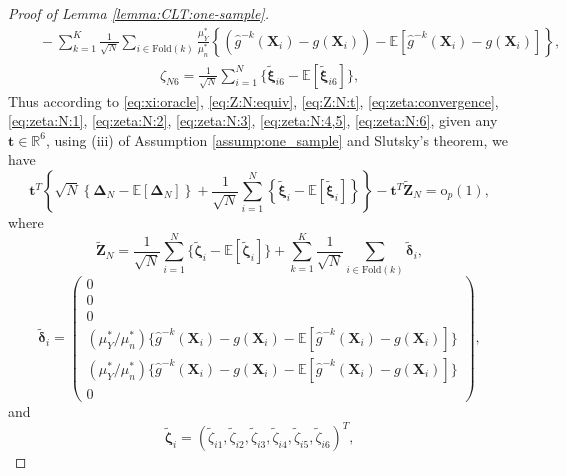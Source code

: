 \documentclass[12pt,letterpaper]{article}
\begin{document}
\begin{proof}[Proof of Lemma \ref{lemma:CLT:one-sample}]
\begin{equation}
\begin{array}{rl}
&\displaystyle\quad-\sum_{k=1}^K\frac{1}{\sqrt{N}}\sum_{i\in\textrm{Fold}(k)}\frac{\mu_Y^*}{\mu_n^*}\left\{\left(\hat{g}^{-k}(\mathbf{X}_i)-g(\mathbf{X}_i)\right)-\mathbb{E}\left[\hat{g}^{-k}(\mathbf{X}_i)-g(\mathbf{X}_i)\right]\right\},
\end{array}
\end{equation}
\begin{equation}\label{eq:zeta:N:6}
\begin{array}{rl}
\displaystyle\zeta_{N6}=\frac{1}{\sqrt{N}}\sum_{i=1}^N\{\tilde{\boldsymbol{\xi}}_{i6}-\mathbb{E}[\tilde{\boldsymbol{\xi}}_{i6}]\},
\end{array}
\end{equation}
Thus according to \eqref{eq:xi:oracle}, \eqref{eq:Z:N:equiv}, \eqref{eq:Z:N:t}, \eqref{eq:zeta:convergence}, \eqref{eq:zeta:N:1}, \eqref{eq:zeta:N:2}, \eqref{eq:zeta:N:3}, \eqref{eq:zeta:N:4,5}, \eqref{eq:zeta:N:6}, given any $\mathbf{t}\in\mathbb{R}^6$, using (iii) of Assumption \ref{assump:one_sample} and Slutsky's theorem, we have 
\begin{equation}\label{eq:Z:equiv:i.n.i.d.}
    \mathbf{t}^T\left\{\sqrt{N}\left\{\mathbf{\Delta}_N-\mathbb{E}[\mathbf{\Delta}_N]\right\}+\frac{1}{\sqrt{N}}\sum_{i=1}^N\left\{\tilde{\boldsymbol{\xi}}_i-\mathbb{E}[\tilde{\boldsymbol{\xi}}_i]\right\}\right\}-\mathbf{t}^T\widetilde{\mathbf{Z}}_N=\mathrm{o}_p(1),
\end{equation}
where 
\begin{equation}\label{eq:Z:tilde:N}
\widetilde{\mathbf{Z}}_N=\frac{1}{\sqrt{N}}\sum_{i=1}^N\{\tilde{\boldsymbol{\zeta}}_i-\mathbb{E}[\tilde{\boldsymbol{\zeta}}_i]\}+\sum_{k=1}^K\frac{1}{\sqrt{N}}\sum_{i\in\textrm{Fold}(k)}\tilde{\boldsymbol{\delta}}_i,   
\end{equation}
$$\tilde{\boldsymbol{\delta}}_i=\begin{pmatrix}
0\\
0\\
0\\
\displaystyle(\mu_Y^*/\mu_n^*)\{\hat{g}^{-k}(\mathbf{X}_i)-g(\mathbf{X}_i)-\mathbb{E}[\hat{g}^{-k}(\mathbf{X}_i)-g(\mathbf{X}_i)]\}\\
\displaystyle(\mu_Y^*/\mu_n^*)\{\hat{g}^{-k}(\mathbf{X}_i)-g(\mathbf{X}_i)-\mathbb{E}[\hat{g}^{-k}(\mathbf{X}_i)-g(\mathbf{X}_i)]\}\\
0
\end{pmatrix},$$
and 
$$\tilde{\boldsymbol{\zeta}}_i=(\tilde{\zeta}_{i1},\tilde{\zeta}_{i2},\tilde{\zeta}_{i3},\tilde{\zeta}_{i4},\tilde{\zeta}_{i5},\tilde{\zeta}_{i6})^T,$$

\end{proof}
\end{document}
